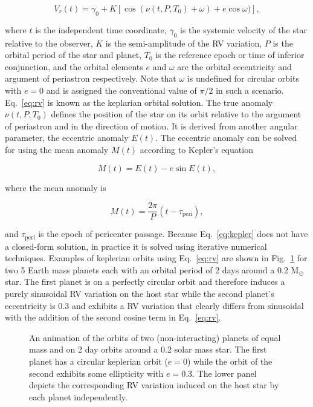 \begin{equation}
V_r(t) = \gamma_0 + K[\cos{(\nu(t,P,T_0) + \omega)} + e\cos{\omega})],
\label{eq:rv}
\end{equation}

\noindent where $t$ is the independent time coordinate, $\gamma_0$ is the systemic velocity of
the star relative to the observer, $K$ is the semi-amplitude of the RV variation,
$P$ is the orbital period of the star and planet, 
$T_0$ is the reference epoch or time of inferior conjunction, and
the orbital elements $e$ and $\omega$ are the orbital eccentricity and argument of
periastron respectively. Note that $\omega$ is undefined for circular orbits with
$e=0$ and is assigned the conventional value of $\pi/2$ in such a scenario.
Eq.~\ref{eq:rv} is known as the keplarian orbital solution.
The true anomaly $\nu(t,P,T_0)$ defines the position of the star on its orbit 
relative to the argument of periastron and in the direction of motion. It is derived 
from another angular parameter, the eccentric anomaly $E(t)$. The eccentric 
anomaly can be solved for using the mean anomaly $M(t)$ according to 
Kepler's equation

\begin{equation}
M(t) = E(t)-e\sin{E(t)},
\label{eq:kepler} 
\end{equation}

\noindent where the mean anomaly is

\begin{equation}
M(t) = \frac{2\pi}{P} (t-\tau_{\mathrm{peri}}), 
\end{equation}

\noindent and $\tau_{\mathrm{peri}}$ is the epoch of 
pericenter passage. Because Eq.~\ref{eq:kepler} does not have a closed-form 
solution, in practice it is solved using iterative numerical techniques. 
Examples of keplerian orbits using Eq.~\ref{eq:rv} are shown in Fig.~\ref{fig:rv} 
for two 5 Earth mass planets each with an orbital period of 2 days around a 0.2 M$_{\odot}$ 
star. The first planet is on a perfectly circular orbit and therefore induces a purely
sinusoidal RV variation on the host star while the second planet's eccentricity is 0.3 and
exhibits a RV variation that clearly differs from sinusoidal with the addition of the second
cosine term in Eq.~\ref{eq:rv}. \\

\begin{figure}
  \centering
  \caption[Animation of observed radial velocities for different orbital configurations.]
      {An animation of the orbits of two (non-interacting) planets of equal
    mass and on 2 day orbits around a 0.2 solar mass star. The first planet has a circular
    keplerian orbit ($e=0$) while the orbit of the second exhibits some ellipticity with
    $e=0.3$. The lower panel depicts the corresponding RV variation induced on the host star
    by each planet independently.}
  \label{fig:rv}
\end{figure}

